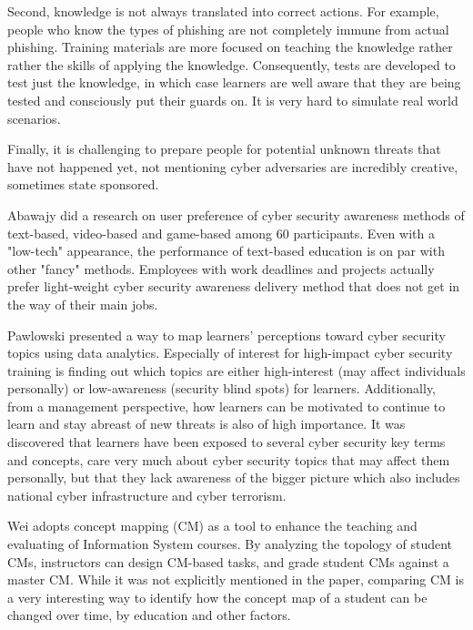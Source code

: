 \documentclass{article} %
\begin{document}
Second, knowledge is not always translated into correct actions. For example, people who know the types of phishing are not completely immune from actual phishing. Training materials are more focused on teaching the knowledge rather rather the skills of applying the knowledge. Consequently, tests are developed to test just the knowledge, in which case learners are well aware that they are being tested and consciously put their guards on. It is very hard to simulate real world scenarios.

Finally, it is challenging to prepare people for potential unknown threats that have not happened yet, not mentioning cyber adversaries are incredibly creative, sometimes state sponsored.

Abawajy \cite{Abawajy2014UserMethods} did a research on user preference of cyber security awareness methods of text-based, video-based and game-based among 60 participants. Even with a "low-tech" appearance, the performance of text-based education is on par with other "fancy" methods. Employees with work deadlines and projects actually prefer light-weight cyber security awareness delivery method that does not get in the way of their main jobs.

Pawlowski \cite{Pawlowski2016SocialDesign} presented a way to map learners' perceptions toward cyber security topics using data analytics.  Especially of interest for high-impact cyber security training is finding out which topics are either high-interest (may affect individuals personally) or low-awareness (security blind spots) for learners.  Additionally, from a management perspective, how learners can be motivated to continue to learn and stay abreast of new threats is also of high importance.  It was discovered that learners have been exposed to several cyber security key terms and concepts, care very much about cyber security topics that may affect them personally, but that they lack awareness of the bigger picture which also includes national cyber infrastructure and cyber terrorism.

Wei \cite{Wei2017IntegratingAssessment} adopts concept mapping (CM) as a tool to enhance the teaching and evaluating of Information System courses. By analyzing the topology of student CMs, instructors can design CM-based tasks, and grade student CMs against a master CM. While it was not explicitly mentioned in the paper, comparing CM is a very interesting way to identify how the concept map of a student can be changed over time, by education and other factors.
\end{document}
